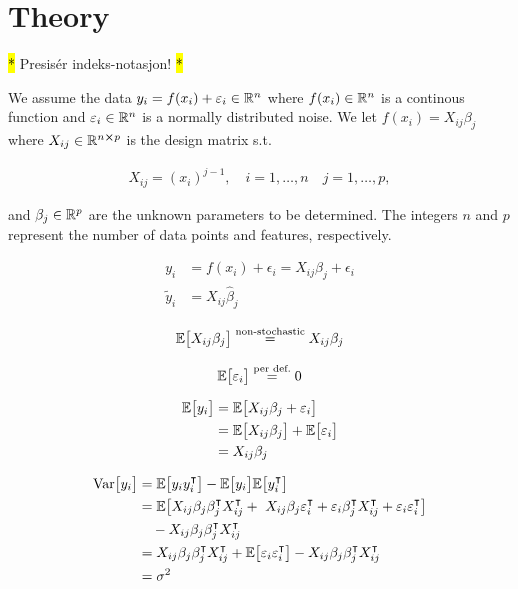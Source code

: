 \section{Theory}\label{sec:theroy}

\hl{*} Presisér indeks-notasjon! \hl{*} 

We assume the data $y_i=f(x_i)+\epsilon_i\in \RR[n]$ where $f(x_i)\in\RR[n]$ is a continous function and $\epsilon_i\in \RR[n] $ is a normally distributed noise. We let $f(x_i)=X_{ij}\beta_{j}$ where $X_{ij}\in \RR[n\cross p]$ is the design matrix s.t.

\begin{align*}
    X_{ij} = (x_i)^{j-1}, \quad i = 1, \dots, n \quad j = 1, \dots, p,
\end{align*}

and $\beta_j\in \RR[p]$ are the unknown parameters to be determined. The integers $n$ and $p$ represent the number of data points and features, respectively. 

\begin{align*}
    y_i &= f(x_i) + \epsilon_i = X_{ij}\beta_j + \epsilon_i \\
    \tilde{y}_i &= X_{ij}\hat{\beta}_j 
\end{align*}


\begin{align*}
    \EE{X_{ij}\beta_j} \stackrel{\text{non-stochastic}}{=} X_{ij}\beta_j 
\end{align*}

\begin{align*}
    \EE{\epsilon_i} \stackrel{\text{per def.}}{=} 0
\end{align*}

\begin{align*}
    \EE{y_i} &= \EE{X_{ij}\beta_j + \epsilon_i} \\
    &= \EE{X_{ij}\beta_j} + \EE{\epsilon_i} \\
    &= X_{ij}\beta_j
\end{align*}


\begin{align*}
    \variance{y_i} &= \EE{y_i y_i\TT} -\EE{y_i}\EE{y_i\TT} \\
    &= \EE{X_{ij}\beta_j\beta_j\TT X_{ij}\TT + X_{ij}\beta_j\epsilon_i\TT + \epsilon_i \beta_j\TT X_{ij}\TT + \epsilon_i \epsilon_i\TT } \\ 
    & \quad - X_{ij}\beta_j\beta_j\TT X_{ij}\TT \\
    &= X_{ij}\beta_j\beta_j\TT X_{ij}\TT  + \EE{\epsilon_i \epsilon_i\TT} - X_{ij}\beta_j\beta_j\TT X_{ij}\TT  \\
    &= \sigma^2
\end{align*}

